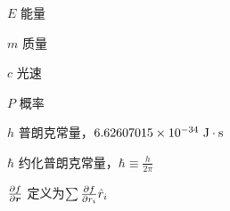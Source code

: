 \begin{denotation}[3cm]
  \item[$E$] 能量
  \item[$m$] 质量
  \item[$c$] 光速
  \item[$P$] 概率
  \item[$h$] 普朗克常量，$6.62607015 \times 10^{-34}\  \mathrm{J \cdot s}$
  \item[$\hbar$] 约化普朗克常量，$\hbar \equiv \frac{h}{2\pi}$
  \item[$\frac{\partial f}{\partial \bm{r}}$] 定义为$\sum \frac{\partial f}{\partial r_i} \hat{r}_i$ 

\end{denotation}
